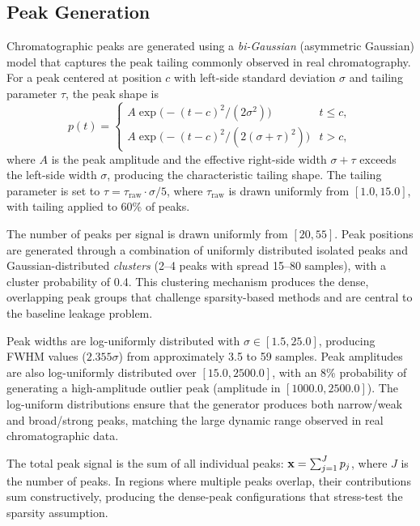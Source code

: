 \subsection{Peak Generation}
\label{sec:exp_peaks}

Chromatographic peaks are generated using a \emph{bi-Gaussian} (asymmetric Gaussian) model that captures the peak tailing commonly observed in real chromatography. For a peak centered at position $c$ with left-side standard deviation $\sigma$ and tailing parameter $\tau$, the peak shape is
\begin{equation}
    p(t) =
    \begin{cases}
        A \exp\!\big(-{(t - c)^2}/{(2\sigma^2)}\big) & t \leq c, \\
        A \exp\!\big(-{(t - c)^2}/{(2(\sigma + \tau)^2)}\big) & t > c,
    \end{cases}
    \label{eq:bigaussian_peak}
\end{equation}
where $A$ is the peak amplitude and the effective right-side width $\sigma + \tau$ exceeds the left-side width $\sigma$, producing the characteristic tailing shape. The tailing parameter is set to $\tau = \tau_{\text{raw}} \cdot \sigma / 5$, where $\tau_{\text{raw}}$ is drawn uniformly from $[1.0, 15.0]$, with tailing applied to 60\% of peaks.

The number of peaks per signal is drawn uniformly from $[20, 55]$. Peak positions are generated through a combination of uniformly distributed isolated peaks and Gaussian-distributed \emph{clusters} (2--4 peaks with spread 15--80 samples), with a cluster probability of 0.4. This clustering mechanism produces the dense, overlapping peak groups that challenge sparsity-based methods and are central to the baseline leakage problem.

Peak widths are log-uniformly distributed with $\sigma \in [1.5, 25.0]$, producing FWHM values ($2.355\sigma$) from approximately 3.5 to 59 samples. Peak amplitudes are also log-uniformly distributed over $[15.0, 2500.0]$, with an 8\% probability of generating a high-amplitude outlier peak (amplitude in $[1000.0, 2500.0]$). The log-uniform distributions ensure that the generator produces both narrow/weak and broad/strong peaks, matching the large dynamic range observed in real chromatographic data.

The total peak signal is the sum of all individual peaks: $\mathbf{x} = \sum_{j=1}^{J} p_j$, where $J$ is the number of peaks. In regions where multiple peaks overlap, their contributions sum constructively, producing the dense-peak configurations that stress-test the sparsity assumption.


